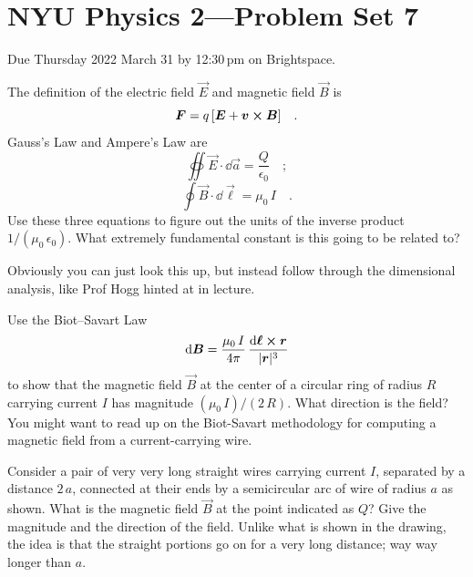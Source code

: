 \documentclass[12pt]{article}
\begin{document}
\section*{NYU Physics 2---Problem Set 7}

Due Thursday 2022 March 31 by 12:30\,pm on Brightspace.

\startproblem%
The definition of the electric field $\vec{E}$ and magnetic field
$\vec{B}$ is
\begin{equation}
  \boldsymbol{F} = q\,[\boldsymbol{E} + \boldsymbol{v}\cross\boldsymbol{B}]
  \quad .
\end{equation}
Gauss's Law and Ampere's Law are
\begin{equation}
  \oiint\vec{E}\cdot\dd\vec{a} = \frac{Q}{\epsilon_0}
  \quad ;
\end{equation}
\begin{equation}
  \oint\vec{B}\cdot\dd\vec{\ell} = \mu_0\,I
  \quad .
\end{equation}
Use these three equations to figure out the units of the inverse
product $1/(\mu_0\,\epsilon_0)$. What extremely fundamental constant
is this going to be related to?

Obviously you can just look this up, but instead follow through the dimensional analysis,
like Prof Hogg hinted at in lecture.

\startproblem%
Use the Biot--Savart Law
\begin{equation}
  \dd\boldsymbol{B} = \frac{\mu_0\,I}{4\pi}\,\frac{\dd\boldsymbol{\ell}\cross\boldsymbol{r}}{|\boldsymbol{r}|^3}
\end{equation}
to show that the magnetic field $\vec{B}$ at the center of a circular
ring of radius $R$ carrying current $I$ has magnitude
$(\mu_0\,I)/(2\,R)$. What direction is the field? You might want to
read up on the Biot-Savart methodology for computing a magnetic field
from a current-carrying wire.

\startproblem%
Consider a pair of very very long straight wires carrying current $I$,
separated by a distance $2\,a$, connected at their ends by a
semicircular arc of wire of radius $a$ as shown. What is the magnetic
field $\vec{B}$ at the point indicated as $Q$? Give the magnitude and
the direction of the field. Unlike what is shown in the drawing,
the idea is that the straight portions go on for a very long distance;
way way longer than $a$.
\end{document}
